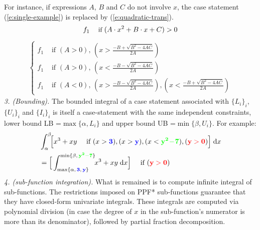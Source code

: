 \documentclass[letterpaper]{article}
\newcommand{\indicator}{\mathbb{I}}%
\newcommand{\case}[2]{#2 &\text{ if } #1}%
\newcommand{\singlecase}[2]{#2 \quad \text{ if } #1}
\newcommand{\dd}{\;\mathrm{d}} %
\begin{document}
\begin{enumerate}[leftmargin=2.6ex]
For instance, if expressions {\footnotesize$A$}, {\footnotesize$B$} and {\footnotesize$C$} do not involve $x$,
the case statement (\ref{e:single-example})
is replaced by (\ref{e:quadratic-trans}).
\begin{equation}\footnotesize
\label{e:single-example}
\singlecase{(A \cdot x^2 + B \cdot x + C)>0}{f_1}
\end{equation}
{\footnotesize
\begin{align}
\label{e:quadratic-trans}
\begin{cases}
  \case{(A>0), \, (x> \frac{-B + \sqrt{B^2 - 4 A C}}{2 A}) }{f_1} \\ 
  \case{(A>0), \, (x< \frac{-B - \sqrt{B^2 - 4 A C}}{2 A}) }{f_1} \\ 
  \case{(A<0), \, (x> \frac{-B - \sqrt{B^2 - 4 A C}}{2 A}),
                              (x< \frac{-B + \sqrt{B^2 - 4 A C}}{2 A})}{f_1}
 \end{cases}
\end{align}
}
\emph{3. (Bounding).} The bounded integral of a case statement 
associated with $\{L_i\}_i$, $\{U_i\}_i$ and $\{I_i\}_i$ 
is itself a case-statement with the same independent constraints,
 lower bound LB =$\max\{\alpha, L_i\}$ and 
 upper bound UB =$ \min\{\beta, U_i\}$.
For example:
{\footnotesize 
\begin{align*}
&\int_{\alpha}^{\beta}\!\! \Big[
\singlecase{(x>{\bf\color{blue}3}), (x>{\bf\color{blue}y}), 
(x<{\bf\color{green}y^2\!-\!7}),  ({\bf\color{red}y>0})}
{x^3 + xy} \Big] \dd x \\
%
&=\singlecase{({\bf\color{red}y>0})}
{\Big[ \int_{\max\{\alpha, \,{\bf {\color{blue}3}, \, {\color{blue}y}}\}}^{\min\{\beta, \, {\bf\color{green} y^2 - 7}\}} \!\! x^3 + xy \dd x \Big]} 
\end{align*}  
}
\emph{4. (sub-function integration).} %
What is remained is to compute infinite integral of sub-functions. 
The restrictions imposed on PPF* sub-functions 
guarantee that they have closed-form %
univariate integrals.
These integrals are computed via polynomial division 
(in case the degree of $x$ in the sub-function's numerator is more than its denominator),
followed by partial fraction decomposition.%



\end{enumerate}
\end{document}
